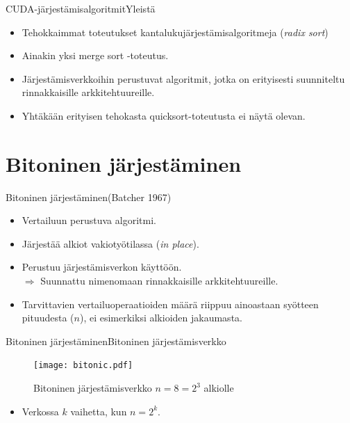 \documentclass{beamer}
\begin{document}

\begin{frame}{CUDA-järjestämisalgoritmit}{Yleistä}
    \begin{itemize}
    \item
      Tehokkaimmat toteutukset kantalukujärjestämisalgoritmeja (\emph{radix sort})
    \item
      Ainakin yksi merge sort -toteutus.
    \item
      Järjestämisverkkoihin perustuvat algoritmit, jotka on erityisesti suunniteltu rinnakkaisille arkkitehtuureille.
    \item
      Yhtäkään erityisen tehokasta quicksort-toteutusta ei näytä olevan.
    \end{itemize}
\end{frame}

\section{Bitoninen järjestäminen}

\begin{frame}{Bitoninen järjestäminen}{(Batcher 1967)}
    \begin{itemize}
    \item
      Vertailuun perustuva algoritmi.
    \item
      Järjestää alkiot vakiotyötilassa (\emph{in place}).
    \item
      Perustuu järjestämisverkon käyttöön. \\ $\Rightarrow$ Suunnattu nimenomaan rinnakkaisille arkkitehtuureille.
    \item
      Tarvittavien vertailuoperaatioiden määrä riippuu ainoastaan syötteen pituudesta ($n$), ei esimerkiksi alkioiden jakaumasta.
    \end{itemize}
\end{frame}

\begin{frame}{Bitoninen järjestäminen}{Bitoninen järjestämisverkko}
    \begin{figure}
        \texttt{[image: bitonic.pdf]}
        \caption{Bitoninen järjestämisverkko $n = 8 = 2^3$ alkiolle}
    \end{figure}
    \begin{itemize}
        \item
          Verkossa $k$ vaihetta, kun $n = 2^k$.
    \end{itemize}
\end{frame}
\end{document}
